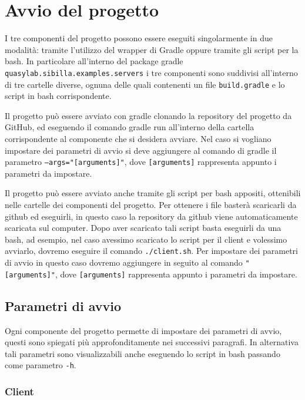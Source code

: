 

\section{Avvio del progetto}
I tre componenti del progetto possono essere eseguiti singolarmente in due modalità: tramite l’utilizzo del wrapper di Gradle oppure tramite gli script per la bash. In particolare all’interno del package gradle \texttt{quasylab.sibilla.examples.servers} i tre componenti sono suddivisi all’interno di tre cartelle diverse, ognuna delle quali contenenti un file \texttt{build.gradle} e lo script in bash corrispondente.

Il progetto può essere avviato con gradle clonando la repository del progetto da GitHub, ed eseguendo il comando gradle run all’interno della cartella corrispondente al componente che si desidera avviare. Nel caso si vogliano impostare dei parametri di avvio si deve aggiungere al comando di gradle il parametro \texttt{--args="[arguments]"}, dove \texttt{[arguments]} rappresenta appunto i parametri da impostare.

Il progetto può essere avviato anche tramite gli script per bash appositi, ottenibili nelle cartelle dei componenti del progetto. Per ottenere i file basterà scaricarli da github ed eseguirli, in questo caso la repository da github viene automaticamente scaricata sul computer. Dopo aver scaricato tali script basta eseguirli da una bash, ad esempio, nel caso avessimo scaricato lo script per il client e volessimo avviarlo, dovremo eseguire il comando \texttt{./client.sh}. Per impostare dei parametri di avvio in questo caso dovremo aggiungere in seguito al comando \texttt{"[arguments]"}, dove \texttt{[arguments]} rappresenta appunto i parametri da impostare.

\subsection{Parametri di avvio}

Ogni componente del progetto permette di impostare dei parametri di avvio, questi sono spiegati più approfonditamente nei successivi paragrafi. In alternativa tali parametri sono visualizzabili anche eseguendo lo script in bash passando come parametro \texttt{-h}.

\subsubsection{Client}

